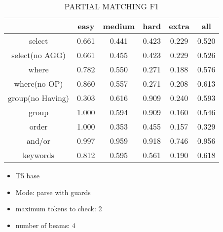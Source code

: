 \begin{table}[h!]
    \centering
    \begin{tabular}{|c|c|c|c|c|c|}
        \hline
                         & easy  & medium & hard  & extra & all   \\ \hline
        select           & 0.661 & 0.441  & 0.423 & 0.229 & 0.520 \\ \hline
        select(no AGG)   & 0.661 & 0.455  & 0.423 & 0.229 & 0.526 \\ \hline
        where            & 0.782 & 0.550  & 0.271 & 0.188 & 0.576 \\ \hline
        where(no OP)     & 0.860 & 0.557  & 0.271 & 0.208 & 0.613 \\ \hline
        group(no Having) & 0.303 & 0.616  & 0.909 & 0.240 & 0.593 \\ \hline
        group            & 1.000 & 0.594  & 0.909 & 0.160 & 0.546 \\ \hline
        order            & 1.000 & 0.353  & 0.455 & 0.157 & 0.329 \\ \hline
        and/or           & 0.997 & 0.959  & 0.918 & 0.746 & 0.956 \\ \hline

        keywords         & 0.812 & 0.595  & 0.561 & 0.190 & 0.618 \\ \hline
    \end{tabular}
    \caption{PARTIAL MATCHING F1 }

\end{table}
\pagebreak
\begin{itemize}
    \item T5 base
    \item Mode: parse with guards
    \item maximum tokens to check: 2
    \item number of beams: 4
\end{itemize}





